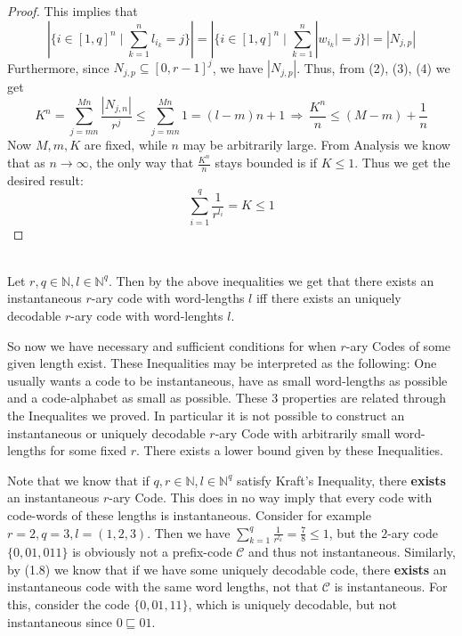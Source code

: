 \documentclass[12pt]{article}
\newenvironment{statement2}[2]{\begin{trivlist}
\item[\hskip \labelsep {\bfseries #1}\hskip \labelsep {\bfseries #2}]}{\end{trivlist}}
\newenvironment{statement3}[3]{\begin{trivlist}
\item[\hskip \labelsep {\bfseries #1}\hskip \labelsep {\bfseries #2} {#3}\textbf{.}]}{\end{trivlist}}
\begin{document}
\begin{statement3}{(1.7)}{Theorem}{(McMillan's Inequality)}
\begin{proof}
        This implies that
        \begin{equation}
            |\{i \in [1,q]^n \mid \sum_{k=1}^{n} l_{i_k} = j\}|
            = |\{i \in [1,q]^n \mid \sum_{k=1}^{n} |w_{i_k}| = j\}| \tag{4}
            = |N_{j,p}|
        \end{equation}
        Furthermore, since $N_{j,p} \subseteq [0,r-1]^j$, we have $|N_{j,p}|$. Thus, from (2), (3), (4) we get
        $$
            K^n = \sum_{j = mn}^{Mn} \frac{|N_{j,n}|}{r^j} \leq \sum_{j = mn}^{Mn} 1 = (l-m)n + 1
            \,\Longrightarrow\, \frac{K^n}{n} \leq (M-m) + \frac{1}{n}
        $$
        Now $M,m,K$ are fixed, while $n$ may be arbitrarily large. From Analysis we know
        that as $n \to \infty$, the only way that $\frac{K^n}{n}$ stays bounded is if $K \leq 1$.
        Thus we get the desired result:
        $$
            \sum_{i=1}^{q} \frac{1}{r^{l_i}} = K \leq 1
        $$
    \end{proof}
\end{statement3}

\begin{statement2}{(1.8)}{Corollary.}\strut\\[2pt]
    Let $r,q \in \mathbb{N}, l \in \mathbb{N}^q$. Then by the above inequalities we get
    that there exists an instantaneous $r$-ary code with word-lengths $l$ iff
    there exists an uniquely decodable $r$-ary code with word-lenghts $l$.
\end{statement2}

So now we have necessary and sufficient conditions for when $r$-ary Codes of some given length exist.
These Inequalities may be interpreted as the following:
One usually wants a code to be instantaneous, have as small word-lengths as possible and a code-alphabet
as small as possible. These 3 properties are related through the Inequalites we proved.
In particular it is not possible to construct an instantaneous or uniquely decodable $r$-ary Code
with arbitrarily small word-lengths for some fixed $r$. There exists a lower bound given by these
Inequalities.

\begin{statement2}{(1.9)}{Remark.}
    Note that we know that if $q,r \in \mathbb{N}, l \in \mathbb{N}^q$
    satisfy Kraft's Inequality, there \textbf{exists} an instantaneous $r$-ary Code. This does in no way imply
    that every code with code-words of these lengths is instantaneous. Consider for example
    $r = 2, q = 3, l = (1,2,3)$. Then we have $\sum_{k=1}^{q} \frac{1}{r^{l_k}} = \frac{7}{8} \leq 1$,
    but the $2$-ary code $\{0, 01, 011\}$ is obviously not a prefix-code $\mathcal{C}$ and thus not instantaneous.
    Similarly, by (1.8) we know that if we have some uniquely decodable code, there \textbf{exists} an
    instantaneous code with the same word lengths, not that $\mathcal{C}$ is instantaneous. For this,
    consider the code $\{0,01,11\}$, which is uniquely decodable, but not instantaneous since $0 \sqsubseteq 01$.
\end{statement2}
\end{document}
